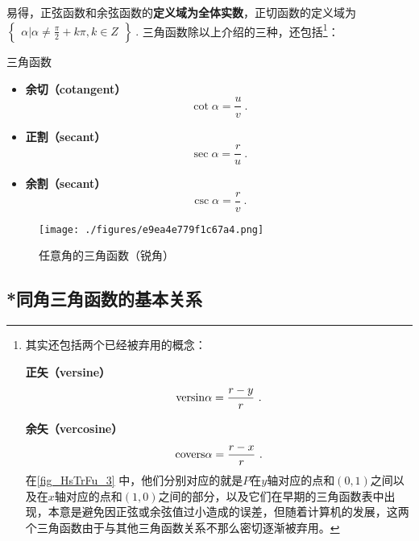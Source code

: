 易得，正弦函数和余弦函数的\textbf{定义域为全体实数}，正切函数的定义域为 $\begin{Bmatrix}\alpha|\alpha \neq \frac{\pi}{2}+k\pi,k\in Z\end{Bmatrix}~.$
三角函数除以上介绍的三种，还包括\footnote{其实还包括两个已经被弃用的概念：

\textbf{正矢（versine）}\begin{equation}
\mathrm{versin }\alpha=\displaystyle{r-y\over r}~.
\end{equation}

\textbf{余矢（vercosine）}
\begin{equation}
\mathrm{covers }\alpha=\displaystyle{r-x\over r}~.
\end{equation}
在\autoref{fig_HsTrFu_3} 中，他们分别对应的就是$P$在$y$轴对应的点和$(0,1)$之间以及在$x$轴对应的点和$(1,0)$之间的部分，以及它们在早期的三角函数表中出现，本意是避免因正弦或余弦值过小造成的误差，但随着计算机的发展，这两个三角函数由于与其他三角函数关系不那么密切逐渐被弃用。}：
\begin{definition}{三角函数}
\begin{itemize}
\item \textbf{余切（cotangent）}
\begin{equation}
\displaystyle\cot \alpha = \frac{u}{v}~.
\end{equation}
\item \textbf{正割（secant）}
\begin{equation}
\displaystyle\sec \alpha = \frac{r}{u}~.
\end{equation}
\item \textbf{余割（secant）}
\begin{equation}
\displaystyle\csc \alpha = \frac{r}{v}~.
\end{equation}
\end{itemize}
\end{definition}
\begin{figure}[ht]
\centering
\texttt{[image: ./figures/e9ea4e779f1c67a4.png]}
\caption{任意角的三角函数（锐角）} \label{fig_HsTrFu_3}
\end{figure}

\subsection{*同角三角函数的基本关系}

